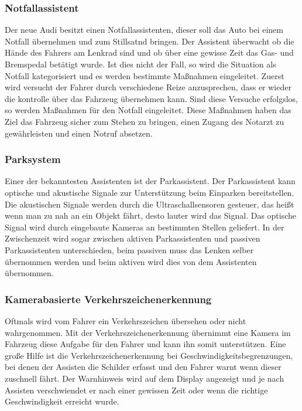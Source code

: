         \subsubsection{Notfallassistent}
        Der neue Audi besitzt einen Notfallassistenten, dieser soll das Auto bei einem Notfall übernehmen 
        und zum Stillsatnd bringen. Der Assistent überwacht ob die Hände des Fahrers am Lenkrad sind und 
        ob über eine gewisse Zeit das Gas- und Bremspedal betätigt wurde. Ist dies nicht der Fall, so 
        wird die Situation als Notfall kategorisiert und es werden bestimmte Maßnahmen eingeleitet.
        Zuerst wird versucht der Fahrer durch verschiedene Reize anzusprechen, dass er wieder die kontrolle 
        über das Fahrzeug übernehmen kann. Sind diese Versuche erfolgslos, so werden Maßnahmen für den 
        Notfall eingeleitet. Diese Maßnahmen haben das Ziel das Fahrzeug sicher zum Stehen zu bringen, einen Zugang des 
        Notarzt zu gewährleisten und einen Notruf absetzen.
        ~\cite{Audi.PB1}
        
        \subsubsection{Parksystem}
        Einer der bekanntesten Assistenten ist der Parkassistent. Der Parkassistent kann optische und 
        akustische Signale zur Unterstützung beim Einparken bereitstellen. Die akustischen Signale werden
        durch die Ultraschallsensoren gesteuer, das heißt wenn man zu nah an ein Objekt fährt, desto lauter 
        wird das Signal. Das optische Signal wird durch eingebaute Kameras an bestimmten Stellen geliefert.
        In der Zwischenzeit wird sogar zwischen aktiven Parkassistenten und passiven Parkassistenten 
        unterschieden, beim passiven muss das Lenken selber übernommen werden und beim aktiven wird 
        dies von dem Assistenten übernommen.
        ~\cite{parkassi.PB1} ~\cite{assistenzsysteme.PB1} ~\cite{parkassi.PB2}
        
        \subsubsection{Kamerabasierte Verkehrszeichenerkennung}
        Oftmals wird vom Fahrer ein Verkehrszeichen übersehen oder nicht wahrgenommen. Mit der Verkehrszeichenerkennung 
        übernimmt eine Kamera im Fahrzeug diese Aufgabe für den Fahrer und kann ihn somit unterstützen.
        Eine große Hilfe ist die Verkehrszeichenerkennung bei Geschwindigkeitsbegrenzungen, bei denen der 
        Assisten die Schilder erfasst und den Fahrer warnt wenn dieser zuschnell fährt. Der Warnhinweis 
        wird auf dem Display angezeigt und je nach Assisten verschwiendet er nach einer gewissen Zeit oder 
        wenn die richtige Geschwindigkeit erreicht wurde.
        ~\cite{assistenzsysteme.PB1} ~\cite{verkehrszeichenerk.PB1} ~\cite{verkehrszeichenerk.PB2}
        
